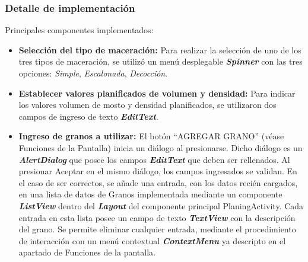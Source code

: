             \subsubsection{Detalle de implementación}
                \par Principales componentes implementados:
                \begin{itemize}
                    \item \textbf{Selección del tipo de maceración:} Para realizar la selección de uno de los tres tipos de maceración, se utilizó un menú desplegable \textbf{\textit{\gls{Spinner}}} con las tres opciones: \textit{Simple}, \textit{Escalonada}, \textit{Decocción}. 
                    
                    \item \textbf{Establecer valores planificados de volumen y densidad:} Para indicar los valores volumen de mosto y densidad planificados, se utilizaron dos campos de ingreso de texto \textbf{\textit{\gls{EditText}}}.
                    
                    \item \textbf{Ingreso de granos a utilizar:} El botón ``AGREGAR GRANO'' (véase Funciones de la Pantalla) inicia un diálogo al presionarse. Dicho diálogo es un \textbf{\textit{\gls{AlertDialog}}} que posee los campos \textbf{\textit{\gls{EditText}}} que deben ser rellenados. 
                    Al presionar Aceptar en el mismo diálogo, los campos ingresados se validan. En el caso de ser correctos, se añade una entrada, con los datos recién cargados, en una lista de datos de Granos implementada mediante un componente \textbf{\textit{\gls{ListView}}} dentro del \textbf{\textit{\gls{Layout}}} del componente principal PlaningActivity. Cada entrada en esta lista posee un campo de texto \textbf{\textit{\gls{TextView}}} con la descripción del grano. 
                    Se permite eliminar cualquier entrada, mediante el procedimiento de interacción con un menú contextual \textbf{\textit{\gls{ContextMenu}}} ya descripto en el apartado de Funciones de la pantalla.
                    

\end{itemize}
